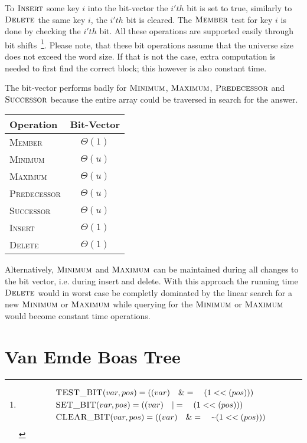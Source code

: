 \documentclass[oneside,11pt,openright]{report}
\newcommand{\BigT}[1]{\ensuremath{\Theta\left(#1\right)}}
\newcommand{\Insert}{\textsc{Insert}}
\newcommand{\Delete}{\textsc{Delete}}
\newcommand{\Member}{\textsc{Member}}
\newcommand{\Minimum}{\textsc{Minimum}}
\newcommand{\Maximum}{\textsc{Maximum}}
\newcommand{\Predecessor}{\textsc{Predecessor}}
\newcommand{\Successor}{\textsc{Successor}}
\begin{document}
To $\Insert$ some key $i$ into the bit-vector the $i'th$ bit is set to
true,  similarly to  $\Delete$ the  same key  $i$, the  $i'th$ bit  is
cleared. The $\Member$ test for key $i$ is done by checking the $i'th$
bit.   All  these   operations  are   supported  easily   through  bit
shifts~\footnote{\begin{align*}   &    \textsc{TEST\_BIT}(var,pos)   =
    ((var)\quad \&=\quad(1<<(pos))) \\  & \textsc{SET\_BIT}(var,pos) =
    ((var)\quad|=\quad(1<<(pos))) \\  & \textsc{CLEAR\_BIT}(var,pos) =
    ((var)\quad\&=\quad\textsf{\textasciitilde}(1<<(pos)))
\end{align*}}. 
Please note, that  these bit operations assume that  the universe size
does  not  exceed the  word  size.  If that  is  not  the case,  extra
computation is needed to first find the correct block; this however is
also constant time.

The   bit-vector   performs    badly   for   $\Minimum$,   $\Maximum$,
$\Predecessor$  and $\Successor$  because  the entire  array could  be
traversed in search for the answer.

\begin{center}
  \begin{tabular}{ l | c }
    Operation & Bit-Vector  \\ \hline
    \Member & $\BigT{1}$ \\ 
    \Minimum & $\BigT{u}$ \\ 
    \Maximum & $\BigT{u}$ \\ 
    \Predecessor & $\BigT{u}$ \\ 
    \Successor & $\BigT{u}$ \\ 
    \Insert & $\BigT{1}$ \\ 
    \Delete & $\BigT{1}$ \\
  \end{tabular}
\end{center}

Alternatively, $\Minimum$ and $\Maximum$  can be maintained during all
changes to  the bit vector, i.e.  during insert and delete.  With this
approach the running  time $\Delete$ would in worst  case be completly
dominated  by the  linear search  for a  new $\Minimum$  or $\Maximum$
while querying for the $\Minimum$  or $\Maximum$ would become constant
time operations.

\chapter{Van Emde Boas Tree}
\end{document}
